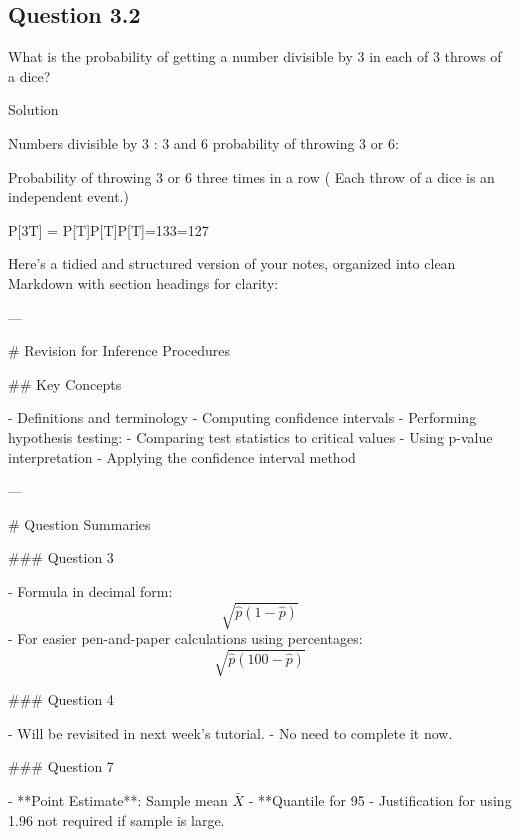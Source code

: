 


\subsection{Question 3.2 }


What is the probability of getting a number divisible by 3 in each of 3 throws of a dice?




Solution



Numbers divisible by 3 : 3 and 6            probability of throwing 3 or 6:   



Probability of throwing 3 or 6 three times in a row  ( Each throw of a dice is an independent event.)



P[3T] = P[T]P[T]P[T]=133=127




Here’s a tidied and structured version of your notes, organized into clean Markdown with section headings for clarity:

---

# Revision for Inference Procedures

## Key Concepts

- Definitions and terminology
- Computing confidence intervals
- Performing hypothesis testing:
  - Comparing test statistics to critical values
  - Using p-value interpretation
  - Applying the confidence interval method

---

# Question Summaries

### Question 3

- Formula in decimal form:  
  \[
  \sqrt{ \hat{p}(1 - \hat{p}) }
  \]
- For easier pen-and-paper calculations using percentages:
  \[
  \sqrt{ \hat{p}(100 - \hat{p}) }
  \]

### Question 4

- Will be revisited in next week’s tutorial.
- No need to complete it now.

### Question 7

- **Point Estimate**: Sample mean \( \bar{X} \)
- **Quantile for 95%
- Justification for using 1.96 not required if sample is large.

